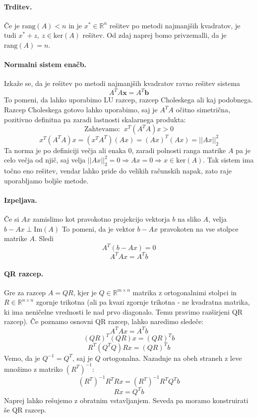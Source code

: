 \documentclass[a4paper]{article}
\newcommand{\R}{\mathbb{R}}
\begin{document}
\paragraph{Trditev.} Če je \(\mathrm{rang}(A) < n\) in je \(x^*\in\R^n\) rešitev po metodi najmanjših kvadratov, je tudi
\(x^* + z,~z\in\mathrm{ker}(A)\) rešitev. Od zdaj naprej bomo privzemalli, da je \(\mathrm{rang}(A)=n\).
\paragraph{Normalni sistem enačb.} Izkaže se, da je rešitev po metodi najmanjših kvadratov ravno rešitev sistema
$$A^TA\mathbf{x}=A^T\mathbf{b}$$
To pomeni, da lahko uporabimo \(\mathrm{LU}\) razcep, razcep Choleskega ali kaj podobnega. Razcep Choleskega gotovo lahko uporabimo, saj je \(A^TA\) očitno simetrična, pozitivno definitna pa zaradi lastnosti skalarnega produkta:
\[\text{Zahtevamo: }~x^T (A^TA) x > 0\]
\[x^T (A^T A) x = (x^T A^T) (Ax) = (Ax)^T(Ax) = ||Ax||_2^2\]
Ta norma je po definiciji večja ali enaka 0, zaradi polnosti ranga matrike \(A\) pa je celo večja od njič, saj velja \(||Ax||_2^2 = 0 \Rightarrow Ax = 0 \Rightarrow x \in \mathrm{ker}(A)\).
Tak sistem ima točno eno rešitev, vendar lahko pride do velikih računskih napak, zato raje uporabljamo boljše metode.
\paragraph{Izpeljava.} Če si \(Ax\) zamislimo kot pravokotno projekcijo vektorja \(b\) na sliko \(A\), velja \(b - Ax \perp \mathrm{Im}(A)\)
To pomeni, da je vektor \(b - Ax\) pravokoten na vse stolpce matrike \(A\). Sledi \[A^T(b-Ax) = 0\]
\[A^TAx = A^Tb\]
\paragraph{QR razcep.} Gre za razcep \(A = QR\), kjer je \(Q \in \R^{m \times n}\) matrika z ortogonalnimi stolpci
in \(R \in \R^{n \times n}\) zgornje trikotna (ali pa kvazi zgornje trikotna - ne kvadratna matrika, ki ima neničelne vrednosti le nad prvo diagonalo. Temu pravimo razširjeni QR razcep).
Če poznamo osnovni QR razcep, lahko naredimo sledeče:
\[A^TAx = A^Tb\]
\[(QR)^T(QR)x = (QR)^Tb\]
\[R^T(Q^TQ)Rx = (QR)^Tb\]
Vemo, da je \(Q^{-1} = Q^T\), saj je \(Q\) ortogonalna. Nazadnje na obeh straneh z leve množimo z matriko \((R^T)^{-1}\):
\[(R^T)^{-1}R^TRx = (R^T)^{-1}R^TQ^Tb\]
\[Rx = Q^Tb\]
Naprej lahko rešujemo z obratnim vstavljanjem. Seveda pa moramo konstruirati še QR razcep.
\end{document}
